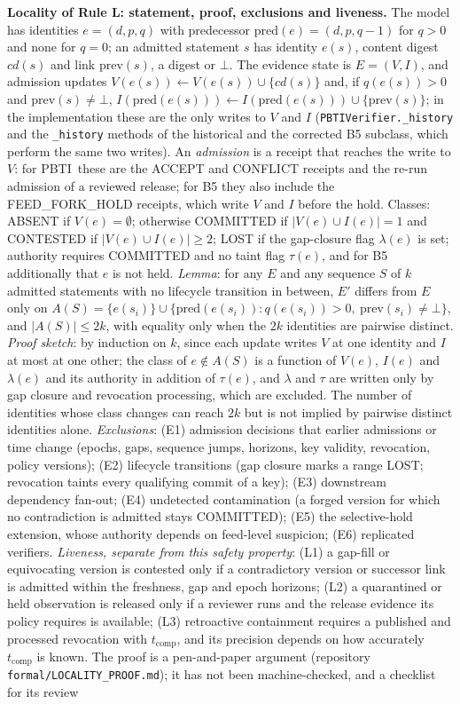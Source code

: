 \documentclass[10pt,a4paper]{article}
\newcommand{\sys}{PBTI}
\begin{document}
\noindent\textbf{Locality of Rule L: statement, proof, exclusions and liveness.} The model has identities $e=(d,p,q)$ with predecessor $\mathrm{pred}(e)=(d,p,q-1)$ for $q>0$ and none for $q=0$; an admitted statement $s$ has identity $e(s)$, content digest $cd(s)$ and link $\mathrm{prev}(s)$, a digest or $\bot$. The evidence state is $E=(V,I)$, and admission updates $V(e(s))\leftarrow V(e(s))\cup\{cd(s)\}$ and, if $q(e(s))>0$ and $\mathrm{prev}(s)\neq\bot$, $I(\mathrm{pred}(e(s)))\leftarrow I(\mathrm{pred}(e(s)))\cup\{\mathrm{prev}(s)\}$; in the implementation these are the only writes to $V$ and $I$ (\texttt{PBTIVerifier.\_\allowbreak{}history} and the \texttt{\_\allowbreak{}history} methods of the historical and the corrected B5 subclass, which perform the same two writes). An \emph{admission} is a receipt that reaches the write to $V$: for \sys\ these are the ACCEPT and CONFLICT receipts and the re-run admission of a reviewed release; for B5 they also include the FEED\_FORK\_HOLD receipts, which write $V$ and $I$ before the hold. Classes: ABSENT if $V(e)=\emptyset$; otherwise COMMITTED if $|V(e)\cup I(e)|=1$ and CONTESTED if $|V(e)\cup I(e)|\ge 2$; LOST if the gap-closure flag $\lambda(e)$ is set; authority requires COMMITTED and no taint flag $\tau(e)$, and for B5 additionally that $e$ is not held. \emph{Lemma}: for any $E$ and any sequence $S$ of $k$ admitted statements with no lifecycle transition in between, $E'$ differs from $E$ only on $A(S)=\{e(s_i)\}\cup\{\mathrm{pred}(e(s_i)): q(e(s_i))>0,\ \mathrm{prev}(s_i)\neq\bot\}$, and $|A(S)|\le 2k$, with equality only when the $2k$ identities are pairwise distinct. \emph{Proof sketch}: by induction on $k$, since each update writes $V$ at one identity and $I$ at most at one other; the class of $e\notin A(S)$ is a function of $V(e)$, $I(e)$ and $\lambda(e)$ and its authority in addition of $\tau(e)$, and $\lambda$ and $\tau$ are written only by gap closure and revocation processing, which are excluded. The number of identities whose class changes can reach $2k$ but is not implied by pairwise distinct identities alone. \emph{Exclusions}: (E1) admission decisions that earlier admissions or time change (epochs, gaps, sequence jumps, horizons, key validity, revocation, policy versions); (E2) lifecycle transitions (gap closure marks a range LOST; revocation taints every qualifying commit of a key); (E3) downstream dependency fan-out; (E4) undetected contamination (a forged version for which no contradiction is admitted stays COMMITTED); (E5) the selective-hold extension, whose authority depends on feed-level suspicion; (E6) replicated verifiers. \emph{Liveness, separate from this safety property}: (L1) a gap-fill or equivocating version is contested only if a contradictory version or successor link is admitted within the freshness, gap and epoch horizons; (L2) a quarantined or held observation is released only if a reviewer runs and the release evidence its policy requires is available; (L3) retroactive containment requires a published and processed revocation with $t_\mathrm{comp}$, and its precision depends on how accurately $t_\mathrm{comp}$ is known. The proof is a pen-and-paper argument (repository \texttt{formal/\allowbreak{}LOCALITY\_\allowbreak{}PROOF.md}); it has not been machine-checked, and a checklist for its review 
\end{document}
